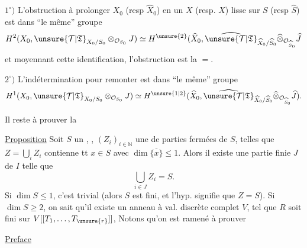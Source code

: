 $1^\circ)$ L'obstruction à prolonger $X_0$ (resp $\widehat X_0$) en un $X$ (resp. $\widehat X$) lisse sur $S$ (resp $\widehat S$) est dans ``le même'' groupe
\[
H^2(X_0,\unsure{\mathcal T|\mathfrak T}_{X_0/S_0}\otimes_{\mathcal O_{S_0}}J)\simeq H^{\unsure{2}}(\widehat X_0,\widehat{\unsure{\mathcal T|\mathfrak T}}_{\widehat X_0/\widehat S_0}\widehat\otimes_{\mathcal O_{\widehat S_0}}\widehat J
\]
et moyennant cette identification, l'obstruction est la $=$.

$2^\circ)$ L'indétermination pour remonter est dans ``le même'' groupe
\[
H^1(X_0,\unsure{\mathcal T|\mathfrak T}_{X_0/S_0}\otimes_{\mathcal O_{S_0}}J)\simeq H^{\unsure{1|2}}(\widehat X_0,\widehat{\unsure{\mathcal T|\mathfrak T}}_{\widehat X_0/\widehat S_0}\widehat\otimes_{\mathcal O_{\widehat S_0}}\widehat J).
\]

Il reste à prouver la

\uline{Proposition} Soit $S$ un  , , $(Z_i)_{i\in\mathbb N}$ une   de parties fermées  de $S$, telles que $Z=\bigcup_i Z_i$ contienne tt $x\in S$ avec $\dim\overline{\{x\}}\leq1$. Alors il existe une partie finie $J$ de $I$ telle que
\[
\bigcup_{i\in J}Z_i=S.
\]
Si $\dim S\leq1$, c'est trivial (alors  $S$ est fini, et l'hyp. signifie que $Z=S$). Si $\dim S\geq2$, on sait qu'il existe un anneau à val. discrète complet $V$,  tel que $R$ soit fini sur $V[[T_1,\ldots,T_{\unsure{r}}]]$,  Notons qu'on est ramené  à prouver


\begin{center}\uline{Preface}\end{center}

